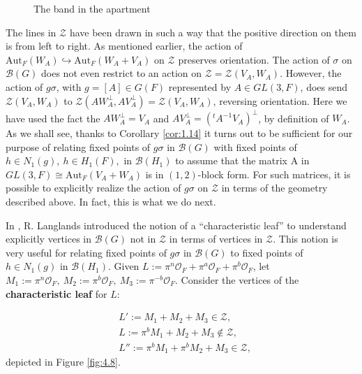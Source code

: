 \documentclass[12pt,letterpaper]{amsart}
\numberwithin{equation}{section}
\theoremstyle{definition}
\theoremstyle{plain}
\providecommand{\cal}{\mathcal}
\def\zz{{\cal Z}}
\def\off{{\cal O}_F}
\def\bbg{{\cal B}(G)}
\def\bbH1{{\cal B}(H_1)}
\begin{document}
\begin{figure}[htbp]
\centering
{}
\caption{The band in the apartment \label{fig:4.6}}
\end{figure}


\noindent
The lines in $\zz$ have been drawn in such a way that the positive direction 
on them is from left to right. As mentioned earlier, the action of
$\text{Aut}_F(W_A) \hookrightarrow \text{Aut}_F(W_A +V_A)$ on $\zz$ preserves
orientation. 
The action of $\sigma$ on $\bbg$ does not even restrict to an action
on $\zz = \zz (V_A,W_A)$. However, the action of $g\sigma$, with 
$g=[A] \in G(F)$ 
represented by $A \in GL(3,F)$, does send $\zz (V_A, W_A)$ to
$\zz (AW_A^{\bot}, AV_A^{\bot}) = \zz (V_A, W_A)$, reversing orientation. 
Here we have used the fact the $AW_A^{\bot} = V_A$ and 
$AV_A^{\bot}=({^{t}A^{-1}}V_A)^{\bot}$, by definition of $W_A$.
As we shall see, thanks to Corollary \ref{cor:1.14} it turns out 
to be sufficient
for our purpose of relating fixed points of $g\sigma$ 
in $\bbg$ with fixed points
of $h\in N_1(g),\ h\in H_1(F),$ in $\bbH1$ to assume that the matrix A in
$GL(3,F) \cong \text{Aut}_F(V_A +W_A)$ is in $(1,2)$-block form. 
For such
matrices, it is possible to explicitly realize the action of $g\sigma$
on $\zz$ in terms of the geometry described above. 
In fact, this is what we do next.
 
In \cite{LaUn}, R. Langlands introduced the notion of a ``characteristic
leaf'' to understand explicitly vertices in $\bbg$ not in $\zz$ in terms
of vertices in $\zz$. 
This notion is very useful for relating fixed
points of $g\sigma$ in $\bbg$ to fixed points of $h\in N_1(g)$ in $\bbH1$. 
Given
$L:=\pi^n\off +\pi^a\off +\pi^b\off$, let $M_1:=\pi^n\off,\ M_2:=\pi^b\off,
\ M_3:=\pi^{-b}\off$. 
Consider the vertices of the {\bf characteristic
leaf} for $L$:

\begin{equation}
\label{eqn:4.7}
\begin{split}
&L':= M_1 +M_2 +M_3 \in \zz,\\ 
&L:= \pi^b M_1 + M_2 +M_3 \notin \zz,\\ 
&L'':= \pi^b M_1 +\pi^b M_2 + M_3 \in \zz,
\end{split}
\end{equation}
depicted in Figure \ref{fig:4.8}.
\end{document}
